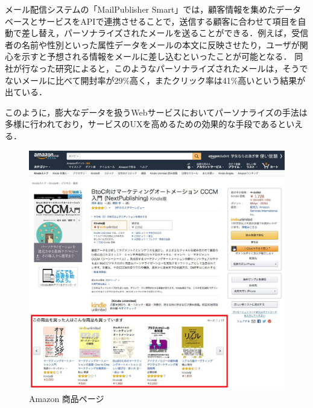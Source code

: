 \documentclass[a4paper]{jsarticle}
\begin{document}
メール配信システムの「MailPublisher Smart\cite{mail_publisher_smart}」では，顧客情報を集めたデータベースとサービスをAPIで連携させることで，送信する顧客に合わせて項目を自動で差し替え，パーソナライズされたメールを送ることができる．例えば，受信者の名前や性別といった属性データをメールの本文に反映させたり，ユーザが関心を示すと予想される情報をメールに差し込むといったことが可能となる．
同社が行なった研究によると，このようなパーソナライズされたメールは，そうでないメールに比べて開封率が29\%高く，またクリック率は41\%高いという結果が出ている\cite{mail_publisher_smart_study}．

このように，膨大なデータを扱うWebサービスにおいてパーソナライズの手法は多様に行われており，サービスのUXを高めるための効果的な手段であるといえる．





\fifigure
\begin{figure}[H]
  \begin{center}
    \includegraphics[width=0.8\hsize]{./images/research_amazon.jpg}
    \caption{Amazon 商品ページ}
    \label{fig:research-amazon}
  \end{center}
\end{figure}
\fi
\end{document}
